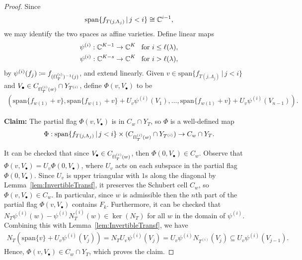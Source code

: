 \documentclass[12pt]{amsart}
\newcommand{\st}{\,|\,}
\newcommand{\vspan}{\mathrm{span}}
\newcommand{\la}{\lambda}
\newcommand{\fl}{\mathrm{f\hspace{0.25pt}l}}
\begin{document}
\begin{proof}
Since
\begin{align}
    \vspan\{f_{T(j,\Lambda_j)}\st j<i\} \cong \bC^{i-1},
\end{align}
we may identify the two spaces as affine varieties. Define linear maps
\begin{align}
    \psi^{(i)} : \bC^{K-1} \to \bC^K & \,\,\,\text{  for  }i\leq \ell(\la),\\
    \psi^{(i)} : \bC^{K-s} \to \bC^K & \,\,\,\text{  for  }i > \ell(\la),
\end{align}
by $\psi^{(i)}(f_j) \coloneqq f_{(\fl_T^{(i)})^{-1}(j)}$, and extend linearly. 
Given $v\in \vspan\{f_{T(j,\Lambda_j)}\st j<i\}$ and $V_\bullet\in C_{\fl_T^{(i)}(w)}\cap Y_{T^{(i)}}$, define $\Phi(v,V_\bullet)$ to be
\begin{align}
   (\vspan\{f_{w(1)}+v\},\vspan\{f_{w(1)}+v\} + U_v\psi^{(i)}(V_1), \dots, \vspan\{f_{w(1)}+v\} + U_v\psi^{(i)}(V_{n-1})).
\end{align}


\textbf{Claim:} The partial flag $\Phi(v,V_\bullet)$ is in $C_w\cap Y_T$, so $\Phi$ is a well-defined map
\begin{align}\label{eq:PhiIso}
 \Phi : \vspan\{f_{T(j,\Lambda_j)}\st j<i\} \times (C_{\fl_T^{(i)}(w)}\cap Y_{T^{(i)}}) \to C_w\cap Y_T.
 \end{align}

It can be checked that since $V_\bullet\in C_{\fl_T^{(i)}(w)}$, then $\Phi(0,V_\bullet) \in C_w$.
Observe that $\Phi(v,V_\bullet) = U_v\Phi(0,V_\bullet)$, where $U_v$ acts on each subspace in the partial flag $\Phi(0,V_\bullet)$. Since $U_v$ is upper triangular with $1$s along the diagonal by Lemma~\ref{lem:InvertibleTransf}, it preserves the Schubert cell $C_w$, so $\Phi(v,V_\bullet)\in C_w$. In particular, since $w$ is admissible then the $n$th part of the partial flag $\Phi(v,V_\bullet)$ contains $F_k$. Furthermore, it can be checked that $N_T\psi^{(i)}(w)-\psi^{(i)}N_T^{(i)}(w)\in \ker(N_T)$ for all $w$ in the domain of $\psi^{(i)}$. Combining this with Lemma~\ref{lem:InvertibleTransf}, we have
\begin{align}
    N_T(\vspan\{v\} + U_v\psi^{(i)}(V_j)) = N_TU_v\psi^{(i)}(V_j) = U_v\psi^{(i)}N_{T^{(i)}}(V_j) \subseteq U_v\psi^{(i)}(V_{j-1}).
\end{align}
Hence, $\Phi(v,V_\bullet)\in C_w\cap Y_T$, which proves the claim.


\end{proof}
\end{document}
